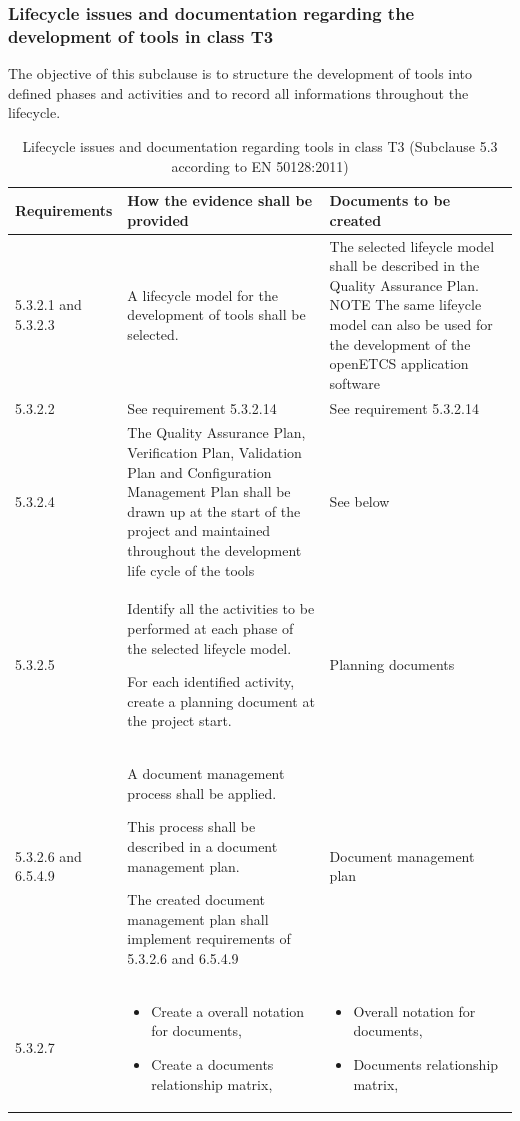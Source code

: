 \documentclass{template/openetcs_report}
\begin{document}
\subsubsection{Lifecycle issues and documentation regarding the development of tools in class T3}
\label{SDLC}
\begin{flushleft}
The objective of this subclause is to structure the development of tools into defined phases and activities and to record all informations throughout the lifecycle.
\end{flushleft}
{\footnotesize\sffamily\centering
\begin{longtable}{|p{2cm}|p{9cm}|p{3cm}|}
\caption{Lifecycle issues and documentation regarding tools in class T3 (Subclause 5.3 according to EN 50128:2011)}\\
\hline
\bfseries Requirements & \bfseries How the evidence shall be provided & \bfseries Documents to be created\\
\hline
\hline
\endhead
\hline
\endfoot

5.3.2.1 and 5.3.2.3 & A lifecycle model for the development of tools shall be selected.
& The selected lifeycle model shall be described in the Quality Assurance Plan.
\linebreak
\linebreak
NOTE\linebreak
The same lifeycle model can also be used for the development of the openETCS application software\\ 
\hline
5.3.2.2 & See requirement 5.3.2.14 & See requirement 5.3.2.14\\ 
\hline
5.3.2.4 & The Quality Assurance Plan, Verification Plan, Validation Plan and Configuration Management Plan shall be drawn up at the start of the project and maintained throughout the development life cycle of the tools & See below\\ 
\hline
5.3.2.5 & Identify all the activities to be performed at each phase of the selected lifeycle model. 

For each identified activity, create a planning document at the project start.
& Planning documents\\ 
\hline
5.3.2.6 and 6.5.4.9 & A document management process shall be applied.
 
This process shall be described in a document management plan.

The created document management plan shall implement requirements of 5.3.2.6 and 6.5.4.9
& Document management plan\\ 
\hline
5.3.2.7 & 
\begin{itemize}\itemsep=0pt
  \item Create a overall notation for documents,
  \item Create a documents relationship matrix,
\end{itemize} 
& 
\begin{itemize}\itemsep=0pt
  \item Overall notation for documents,
  \item Documents relationship matrix,
\end{itemize} 



\end{longtable}}
\end{document}
